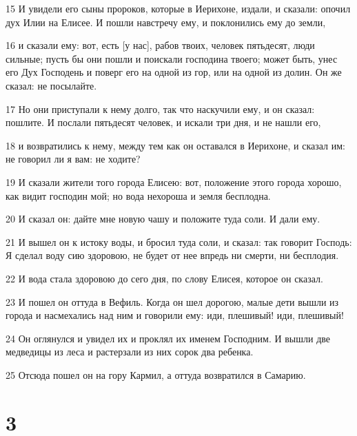 \par 15 И увидели его сыны пророков, которые в Иерихоне, издали, и сказали: опочил дух Илии на Елисее. И пошли навстречу ему, и поклонились ему до земли,
\par 16 и сказали ему: вот, есть [у нас], рабов твоих, человек пятьдесят, люди сильные; пусть бы они пошли и поискали господина твоего; может быть, унес его Дух Господень и поверг его на одной из гор, или на одной из долин. Он же сказал: не посылайте.
\par 17 Но они приступали к нему долго, так что наскучили ему, и он сказал: пошлите. И послали пятьдесят человек, и искали три дня, и не нашли его,
\par 18 и возвратились к нему, между тем как он оставался в Иерихоне, и сказал им: не говорил ли я вам: не ходите?
\par 19 И сказали жители того города Елисею: вот, положение этого города хорошо, как видит господин мой; но вода нехороша и земля бесплодна.
\par 20 И сказал он: дайте мне новую чашу и положите туда соли. И дали ему.
\par 21 И вышел он к истоку воды, и бросил туда соли, и сказал: так говорит Господь: Я сделал воду сию здоровою, не будет от нее впредь ни смерти, ни бесплодия.
\par 22 И вода стала здоровою до сего дня, по слову Елисея, которое он сказал.
\par 23 И пошел он оттуда в Вефиль. Когда он шел дорогою, малые дети вышли из города и насмехались над ним и говорили ему: иди, плешивый! иди, плешивый!
\par 24 Он оглянулся и увидел их и проклял их именем Господним. И вышли две медведицы из леса и растерзали из них сорок два ребенка.
\par 25 Отсюда пошел он на гору Кармил, а оттуда возвратился в Самарию.

\chapter{3}

